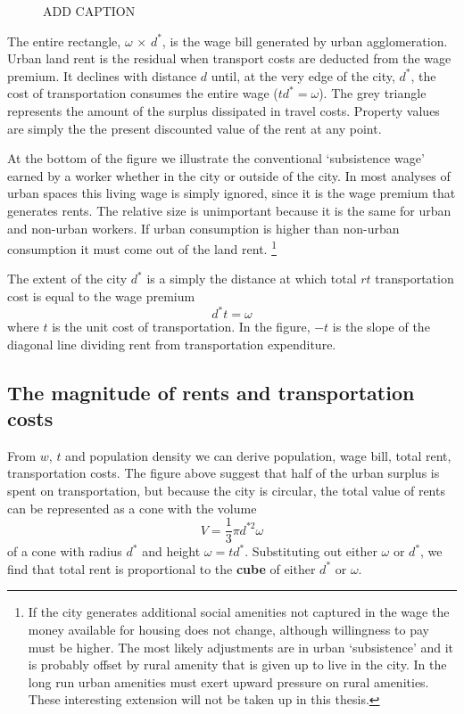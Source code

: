 \begin{figure}
    \begin{center}
    
    \caption{ADD CAPTION}
    \label{fig-alonzo-simple}
    \end{center}
\end{figure}

The entire rectangle, $\omega$ $\times$ $d^*$, is the wage bill generated by urban agglomeration. Urban land rent is the residual when transport costs are deducted from the wage premium. It declines  with distance $d$ until, at the very edge of the city, $d^*$, the cost of transportation  consumes the entire wage ($td^*=\omega$). The grey triangle represents the amount of the surplus dissipated in travel costs.  Property values are simply the the present discounted value of the rent at any point.

At the bottom of the figure we illustrate the conventional `subsistence wage'  earned by a worker whether in the city or outside of the city.   In most analyses of urban spaces this living wage is simply ignored, since it is the wage premium that generates rents.  The relative size is unimportant because it is the same for urban and non-urban workers. If urban consumption is higher than non-urban consumption it must come out of the land rent.
\footnote{If the city generates additional social amenities not captured in the wage  the money available for housing does not change, although willingness to pay must be higher.  The  most likely adjustments are in urban `subsistence' and it is probably offset by rural amenity that is given up to live in the city. In the long run urban amenities must exert upward pressure on rural amenities. These interesting extension will not be taken up in this thesis.}

The extent  of the city  $d^*$ is a simply the distance at which total $rt$ transportation cost  is equal to the wage premium
\[d^* t= \omega\]
where $t$ is the unit cost of transportation. In the figure, $-t$ is the slope of the diagonal line dividing rent from transportation expenditure.


 \subsection{The magnitude of rents and transportation costs}
 From $w$, $t$ and population density we can derive population, wage bill, total rent, transportation costs. The figure above suggest that  half of the urban surplus is spent on transportation, but because the city is circular, the total value of rents can be represented as  a cone with the volume  \[ V=\frac{1}{3}\pi  d^{*2} \omega \]
of a cone with radius $d^*$ and  height $\omega = td^*$. Substituting out either  $\omega$ or  $d^*$, we find that total rent is  proportional to the \textbf{cube} of either  $d^*$ or $\omega$. 

